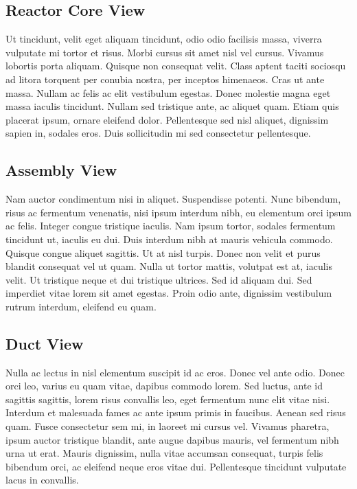 \subsection{Reactor Core View}
Ut tincidunt, velit eget aliquam tincidunt, odio odio facilisis massa, viverra vulputate mi tortor et risus. Morbi cursus sit amet nisl vel cursus. Vivamus lobortis porta aliquam. Quisque non consequat velit. Class aptent taciti sociosqu ad litora torquent per conubia nostra, per inceptos himenaeos. Cras ut ante massa. Nullam ac felis ac elit vestibulum egestas. Donec molestie magna eget massa iaculis tincidunt. Nullam sed tristique ante, ac aliquet quam. Etiam quis placerat ipsum, ornare eleifend dolor. Pellentesque sed nisl aliquet, dignissim sapien in, sodales eros. Duis sollicitudin mi sed consectetur pellentesque.

\subsection{Assembly View}
Nam auctor condimentum nisi in aliquet. Suspendisse potenti. Nunc bibendum, risus ac fermentum venenatis, nisi ipsum interdum nibh, eu elementum orci ipsum ac felis. Integer congue tristique iaculis. Nam ipsum tortor, sodales fermentum tincidunt ut, iaculis eu dui. Duis interdum nibh at mauris vehicula commodo. Quisque congue aliquet sagittis. Ut at nisl turpis. Donec non velit et purus blandit consequat vel ut quam. Nulla ut tortor mattis, volutpat est at, iaculis velit. Ut tristique neque et dui tristique ultrices. Sed id aliquam dui. Sed imperdiet vitae lorem sit amet egestas. Proin odio ante, dignissim vestibulum rutrum interdum, eleifend eu quam. 

\subsection{Duct View}
Nulla ac lectus in nisl elementum suscipit id ac eros. Donec vel ante odio. Donec orci leo, varius eu quam vitae, dapibus commodo lorem. Sed luctus, ante id sagittis sagittis, lorem risus convallis leo, eget fermentum nunc elit vitae nisi. Interdum et malesuada fames ac ante ipsum primis in faucibus. Aenean sed risus quam. Fusce consectetur sem mi, in laoreet mi cursus vel. Vivamus pharetra, ipsum auctor tristique blandit, ante augue dapibus mauris, vel fermentum nibh urna ut erat. Mauris dignissim, nulla vitae accumsan consequat, turpis felis bibendum orci, ac eleifend neque eros vitae dui. Pellentesque tincidunt vulputate lacus in convallis.

